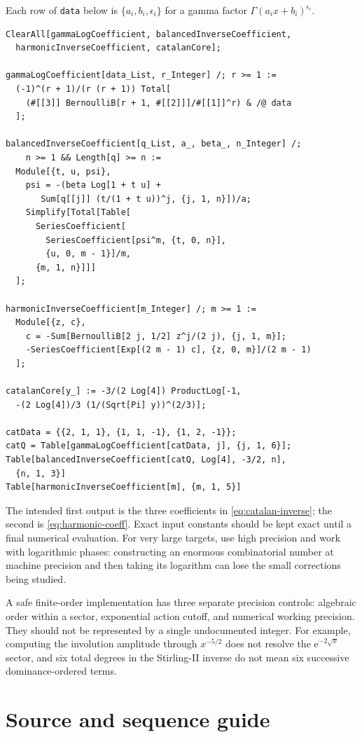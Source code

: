\documentclass[11pt,a4paper]{article}
\numberwithin{equation}{section}
\theoremstyle{definition}
\theoremstyle{remark}
\newcommand{\ee}{\mathrm e}
\begin{document}
Each row of \texttt{data} below is $\{a_i,b_i,\epsilon_i\}$ for a gamma factor $\Gamma(a_ix+b_i)^{\epsilon_i}$.
\begin{lstlisting}
ClearAll[gammaLogCoefficient, balancedInverseCoefficient,
  harmonicInverseCoefficient, catalanCore];

gammaLogCoefficient[data_List, r_Integer] /; r >= 1 :=
  (-1)^(r + 1)/(r (r + 1)) Total[
    (#[[3]] BernoulliB[r + 1, #[[2]]]/#[[1]]^r) & /@ data
  ];

balancedInverseCoefficient[q_List, a_, beta_, n_Integer] /;
    n >= 1 && Length[q] >= n :=
  Module[{t, u, psi},
    psi = -(beta Log[1 + t u] +
       Sum[q[[j]] (t/(1 + t u))^j, {j, 1, n}])/a;
    Simplify[Total[Table[
      SeriesCoefficient[
        SeriesCoefficient[psi^m, {t, 0, n}],
        {u, 0, m - 1}]/m,
      {m, 1, n}]]]
  ];

harmonicInverseCoefficient[m_Integer] /; m >= 1 :=
  Module[{z, c},
    c = -Sum[BernoulliB[2 j, 1/2] z^j/(2 j), {j, 1, m}];
    -SeriesCoefficient[Exp[(2 m - 1) c], {z, 0, m}]/(2 m - 1)
  ];

catalanCore[y_] := -3/(2 Log[4]) ProductLog[-1,
  -(2 Log[4])/3 (1/(Sqrt[Pi] y))^(2/3)];

catData = {{2, 1, 1}, {1, 1, -1}, {1, 2, -1}};
catQ = Table[gammaLogCoefficient[catData, j], {j, 1, 6}];
Table[balancedInverseCoefficient[catQ, Log[4], -3/2, n],
  {n, 1, 3}]
Table[harmonicInverseCoefficient[m], {m, 1, 5}]
\end{lstlisting}

The intended first output is the three coefficients in \eqref{eq:catalan-inverse}; the second is \eqref{eq:harmonic-coeff}. Exact input constants should be kept exact until a final numerical evaluation. For very large targets, use high precision and work with logarithmic phases: constructing an enormous combinatorial number at machine precision and then taking its logarithm can lose the small corrections being studied.

A safe finite-order implementation has three separate precision controls: algebraic order within a sector, exponential action cutoff, and numerical working precision. They should not be represented by a single undocumented integer. For example, computing the involution amplitude through $x^{-5/2}$ does not resolve the $\ee^{-2\sqrt x}$ sector, and six total degrees in the Stirling-II inverse do not mean six successive dominance-ordered terms.

\section{Source and sequence guide}
\label{app:sources}
\end{document}
